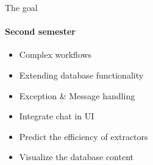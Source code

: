 \begin{frame}{The goal}
\framesubtitle{Second semester}
	\begin{itemize}
		\item Complex workflows
		\item Extending database functionality
		\item Exception \& Message handling
		\item Integrate chat in UI
		\item Predict the efficiency of extractors
		\item Visualize the database content
	\end{itemize}
\end{frame}
